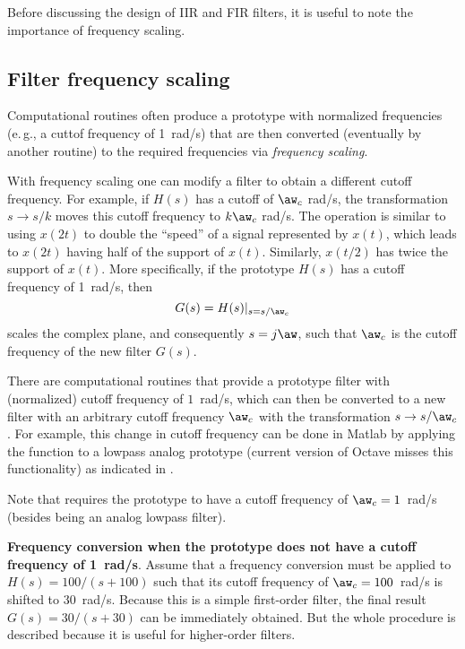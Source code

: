 Before discussing the design of IIR and FIR filters, it is useful to 
note the importance of frequency scaling.

\subsection{Filter frequency scaling}
\label{sec:frequencyScaling}
Computational routines often produce a prototype with normalized frequencies (e.\,g., a cuttof frequency of 1~rad/s) that are then converted (eventually by another routine) to the required frequencies via \emph{frequency scaling}. 

With frequency scaling one can modify a filter to obtain a different cutoff frequency. For example, if $H(s)$ has a cutoff of $\aw_c$ rad/s, the transformation $s \rightarrow s/k$ moves this cutoff frequency to $k \aw_c$ rad/s. The operation is similar to using $x(2t)$ to double the ``speed'' of a signal represented by $x(t)$, which leads to $x(2t)$ having half of the support of $x(t)$. Similarly, $x(t/2)$ has twice the support of $x(t)$.
More specifically, if the prototype $H(s)$ has a cutoff frequency of 1~rad/s, then
\begin{equation}
G(s) = H(s)|_{s=s/\aw_c}
\label{eq:frequencyScaling}
\end{equation}
scales the complex plane, and consequently $s=j \aw$, such that $\aw_c$ is the 
cutoff frequency of the new filter $G(s)$.

There are computational routines that provide a prototype filter with (normalized) cutoff frequency of $1$~rad/s, which can then be converted to a new filter with an arbitrary cutoff frequency $\aw_c$ with the transformation $s \rightarrow s/\aw_c$. For example, this change in cutoff frequency can be done in Matlab by applying the function  to a lowpass analog prototype (current version of Octave misses this functionality) as indicated in .


Note that  requires the prototype to have a cutoff frequency of $\aw_c = 1$~rad/s (besides being an analog lowpass filter). 

\bExample \textbf{Frequency conversion when the prototype does not have a cutoff frequency of 1~rad/s}.
Assume that a frequency conversion must be applied to $H(s)=100/(s+100)$ such that
its cutoff frequency of $\aw_c = 100$~rad/s is shifted to 30~rad/s. Because this
is a simple first-order filter, the final result $G(s)=30/(s+30)$ can be immediately
obtained. But the whole procedure is described because it is useful for higher-order filters.

